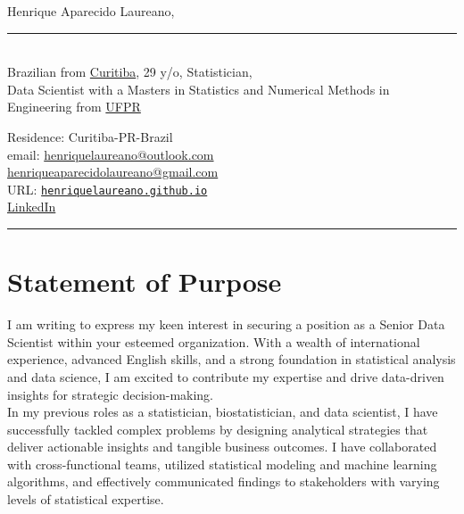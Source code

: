 \documentclass[12pt]{article}
\newcommand{\horrule}[1]{\noindent\rule{\linewidth}{#1}}
\begin{document}
\noindent
\begin{minipage}[t]{.565\textwidth}
 \raggedright
 \large Henrique Aparecido Laureano,
 \noindent\rule{.89\linewidth}{1pt}\\
 \normalsize Brazilian from
 \href{https://goo.gl/K1Qcdv}{\color{blue}Curitiba}, 29 y/o,
 Statistician,\\Data Scientist with a Masters in Statistics and
 Numerical Methods in Engineering from 
 \href{https://goo.gl/DtVAbi}{\color{blue}UFPR}
\end{minipage}%
\begin{minipage}[t]{.435\textwidth}
 \raggedright
 Residence: Curitiba-PR-Brazil\\
 email:
 \href{mailto:henriquelaureano@outlook.com}{\color{blue}
   henriquelaureano@outlook.com}\\
 \hspace{1.2cm}
 \href{mailto:henriqueaparecidolaureano@gmail.com}{\color{blue}
   henriqueaparecidolaureano@gmail.com}\\
 URL:
 \href{https://henriquelaureano.github.io/}{
  \color{blue}\texttt{henriquelaureano.github.io}}\\
 \href{https://www.linkedin.com/in/henrique-laureano-025328179}{
  \color{blue}LinkedIn}
\end{minipage}

\vspace{0.5cm}
\horrule{1pt}

\vspace{-0.25cm}
\section*{Statement of Purpose}

I am writing to express my keen interest in securing a position as a Senior
Data Scientist within your esteemed organization. With a wealth of
international experience, advanced English skills, and a strong foundation in
statistical analysis and data science, I am excited to contribute my expertise
and drive data-driven insights for strategic decision-making.\\

In my previous roles as a statistician, biostatistician, and data scientist, I 
have successfully tackled complex problems by designing analytical strategies 
that deliver actionable insights and tangible business outcomes. I have 
collaborated with cross-functional teams, utilized statistical modeling and 
machine learning algorithms, and effectively communicated findings to 
stakeholders with varying levels of statistical expertise.\\
\end{document}
